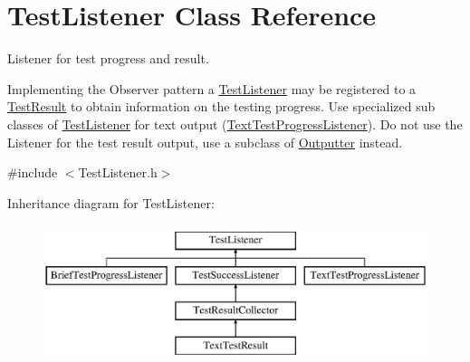 \hypertarget{class_test_listener}{\section{Test\-Listener Class Reference}
\label{class_test_listener}
}


Listener for test progress and result.

Implementing the Observer pattern a \hyperlink{class_test_listener}{Test\-Listener} may be registered to a \hyperlink{class_test_result}{Test\-Result} to obtain information on the testing progress. Use specialized sub classes of \hyperlink{class_test_listener}{Test\-Listener} for text output (\hyperlink{class_text_test_progress_listener}{Text\-Test\-Progress\-Listener}). Do not use the Listener for the test result output, use a subclass of \hyperlink{class_outputter}{Outputter} instead.  




{\ttfamily \#include $<$Test\-Listener.\-h$>$}

Inheritance diagram for Test\-Listener\-:\begin{figure}[H]
\begin{center}
\leavevmode
\includegraphics[height=4.000000cm]{class_test_listener}
\end{center}
\end{figure}
